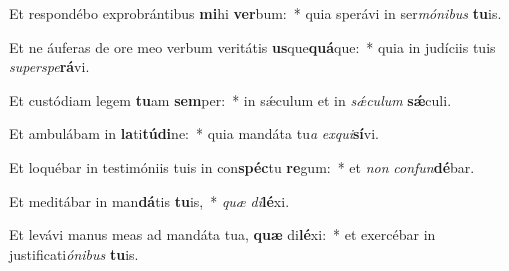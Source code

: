 \item Et respondébo exprobrántibus \textbf{mi}hi \textbf{ver}bum:~* quia sperávi in ser\textit{mó}\textit{ni}\textit{bus} \textbf{tu}is.
\item Et ne áuferas de ore meo verbum veritátis \textbf{us}que\textbf{quá}que:~* quia in judíciis tuis \textit{su}\textit{per}\textit{spe}\textbf{rá}vi.
\item Et custódiam legem \textbf{tu}am \textbf{sem}per:~* in sǽculum et in \textit{sǽ}\textit{cu}\textit{lum} \textbf{sǽ}culi.
\item Et ambulábam in \textbf{la}ti\textbf{tú}\textbf{di}ne:~* quia mandáta tu\textit{a} \textit{ex}\textit{qui}\textbf{sí}vi.
\item Et loquébar in testimóniis tuis in con\textbf{spéc}tu \textbf{re}gum:~* et \textit{non} \textit{con}\textit{fun}\textbf{dé}bar.
\item Et meditábar in man\textbf{dá}tis \textbf{tu}is,~* \textit{quæ} \textit{di}\textbf{lé}xi.
\item Et levávi manus meas ad mandáta tua, \textbf{quæ} di\textbf{lé}xi:~* et exercébar in justificati\textit{ó}\textit{ni}\textit{bus} \textbf{tu}is.
